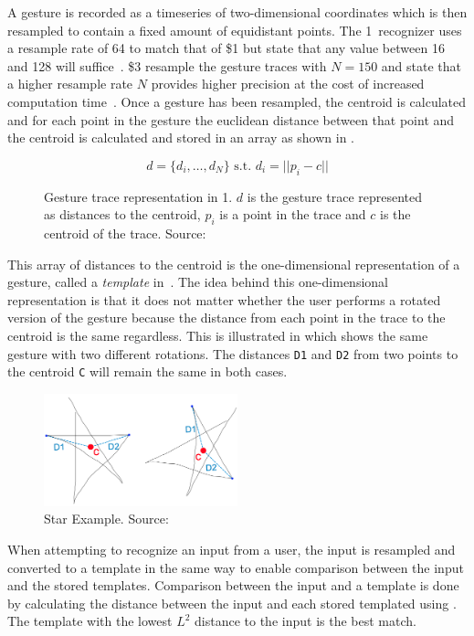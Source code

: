 A gesture is recorded as a timeseries of two-dimensional coordinates which is then resampled to contain a fixed amount of equidistant points.
The 1\textcent~recognizer uses a resample rate of 64 to match that of \$1 but state that any value between 16 and 128 will suffice~\cite[p. 41]{herold20121}.
\$3 resample the gesture traces with $N = 150$ and state that a higher resample rate $N$ provides higher precision at the cost of increased computation time~\cite[p. 342]{threedollar}.
Once a gesture has been resampled, the centroid is calculated and for each point in the gesture the euclidean distance between that point and the centroid is calculated and stored in an array as shown in .

\begin{figure}[h]
\[ d = \{d_i,\ldots,d_N\} \text{ s.t. } d_i=||p_i-c|| \]
\caption{Gesture trace representation in 1\textcent. $d$ is the gesture trace represented as distances to the centroid, $p_i$ is a point in the trace and $c$ is the centroid of the trace. Source:~\cite{herold20121}}
\label{eq:one-cent-trace}
\end{figure}

This array of distances to the centroid is the one-dimensional representation of a gesture, called a \emph{template} in~\cite{herold20121}.
The idea behind this one-dimensional representation is that it does not matter whether the user performs a rotated version of the gesture because the distance from each point in the trace to the centroid is the same regardless.
This is illustrated in  which shows the same gesture with two different rotations.
The distances \texttt{D1} and \texttt{D2} from two points to the centroid \texttt{C} will remain the same in both cases.

\begin{figure}[h]
\centering
\includegraphics[width=0.5\textwidth]{images/one-cent-star-example}
\caption{Star Example. Source:~\cite{herold20121}}
\label{fig:one-cent-star}
\end{figure}

When attempting to recognize an input from a user, the input is resampled and converted to a template in the same way to enable comparison between the input and the stored templates.
Comparison between the input and a template is done by calculating the distance between the input and each stored templated using .
The template with the lowest $L^2$ distance to the input is the best match.

